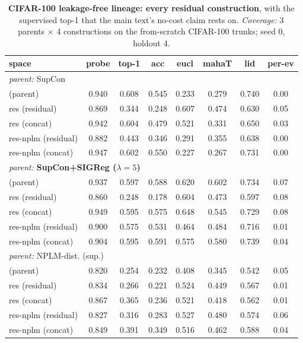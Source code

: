\begin{table}[t]
\centering
\small
\begin{tabular}{lccccccc}
\toprule
space & probe & top-1 & acc & eucl & mahaT & lid & per-ev \\
\midrule
\multicolumn{8}{l}{\emph{parent: }SupCon} \\
\quad (parent) & 0.940 & 0.608 & 0.545 & 0.233 & 0.279 & 0.740 & 0.00 \\
\quad res (residual) & 0.869 & 0.344 & 0.248 & 0.607 & 0.474 & 0.630 & 0.05 \\
\quad res (concat) & 0.942 & 0.604 & 0.479 & 0.521 & 0.331 & 0.650 & 0.03 \\
\quad res-nplm (residual) & 0.882 & 0.443 & 0.346 & 0.291 & 0.355 & 0.638 & 0.00 \\
\quad res-nplm (concat) & 0.947 & 0.602 & 0.550 & 0.227 & 0.267 & 0.731 & 0.00 \\
\multicolumn{8}{l}{\emph{parent: }\textbf{SupCon+SIGReg ($\lambda{=}5$)}} \\
\quad (parent) & 0.937 & 0.597 & 0.588 & 0.620 & 0.602 & 0.734 & 0.07 \\
\quad res (residual) & 0.860 & 0.248 & 0.178 & 0.604 & 0.473 & 0.597 & 0.08 \\
\quad res (concat) & 0.949 & 0.595 & 0.575 & 0.648 & 0.545 & 0.729 & 0.08 \\
\quad res-nplm (residual) & 0.900 & 0.575 & 0.531 & 0.464 & 0.484 & 0.716 & 0.01 \\
\quad res-nplm (concat) & 0.904 & 0.595 & 0.591 & 0.575 & 0.580 & 0.739 & 0.04 \\
\multicolumn{8}{l}{\emph{parent: }NPLM-dist. (sup.)} \\
\quad (parent) & 0.820 & 0.254 & 0.232 & 0.408 & 0.345 & 0.542 & 0.05 \\
\quad res (residual) & 0.834 & 0.266 & 0.221 & 0.524 & 0.449 & 0.567 & 0.01 \\
\quad res (concat) & 0.867 & 0.365 & 0.236 & 0.521 & 0.418 & 0.562 & 0.01 \\
\quad res-nplm (residual) & 0.827 & 0.316 & 0.283 & 0.527 & 0.480 & 0.574 & 0.06 \\
\quad res-nplm (concat) & 0.849 & 0.391 & 0.349 & 0.516 & 0.462 & 0.588 & 0.04 \\
\bottomrule
\end{tabular}
\caption{\textbf{CIFAR-100 leakage-free lineage: every residual construction}, with the supervised top-1 that the main text's no-cost claim rests on. \emph{Coverage:} 3 parents $\times$ 4 constructions on the from-scratch CIFAR-100 trunks; seed 0, holdout 4.}
\label{tab:app_cifar100_residuals}
\end{table}
